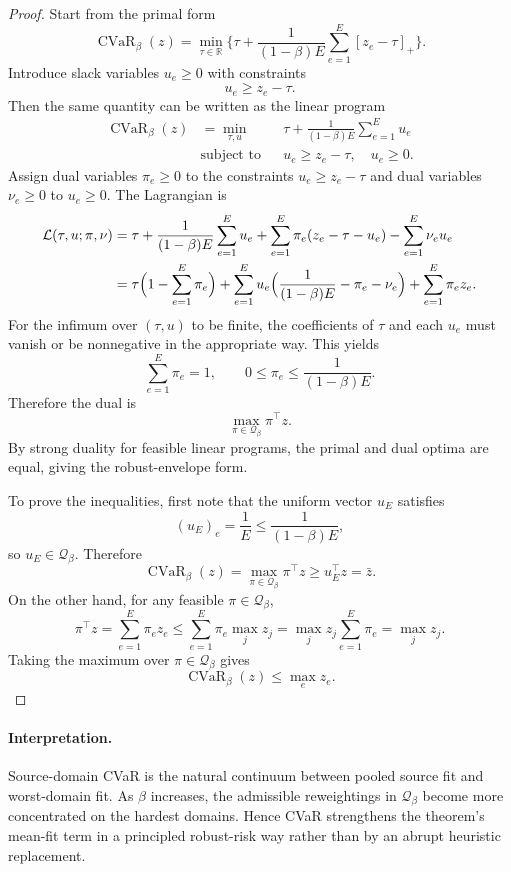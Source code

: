\documentclass[11pt]{article}
\newcommand{\R}{\mathbb{R}}
\newcommand{\1}{\mathbf{1}}
\newcommand{\cvar}{\operatorname{CVaR}}
\newcommand{\ubar}{u_E}
\newcommand{\Qset}{\mathcal{Q}_\beta}
\theoremstyle{plain}
\theoremstyle{definition}
\theoremstyle{remark}
\begin{document}
\begin{proof}
Start from the primal form
\[
\cvar_{\beta}(z)
= \min_{\tau \in \R} \Biggl\{\tau + \frac{1}{(1-\beta)E}\sum_{e=1}^E [z_e - \tau]_+\Biggr\}.
\]
Introduce slack variables $u_e \ge 0$ with constraints
\[
u_e \ge z_e - \tau.
\]
Then the same quantity can be written as the linear program
\begin{align*}
\cvar_{\beta}(z)
&= \min_{\tau, u} && \tau + \frac{1}{(1-\beta)E}\sum_{e=1}^E u_e \\
&\text{subject to} && u_e \ge z_e - \tau, \quad u_e \ge 0.
\end{align*}
Assign dual variables $\pi_e \ge 0$ to the constraints $u_e \ge z_e - \tau$ and dual variables $\nu_e \ge 0$ to $u_e \ge 0$. The Lagrangian is
\begin{align*}
\mathcal{L}(\tau, u; \pi, \nu)
&= \tau + \frac{1}{(1-\beta)E}\sum_{e=1}^E u_e
+ \sum_{e=1}^E \pi_e(z_e - \tau - u_e)
- \sum_{e=1}^E \nu_e u_e \\
&= \tau\Bigl(1 - \sum_{e=1}^E \pi_e\Bigr)
+ \sum_{e=1}^E u_e\Bigl(\frac{1}{(1-\beta)E} - \pi_e - \nu_e\Bigr)
+ \sum_{e=1}^E \pi_e z_e.
\end{align*}
For the infimum over $(\tau,u)$ to be finite, the coefficients of $\tau$ and each $u_e$ must vanish or be nonnegative in the appropriate way. This yields
\[
\sum_{e=1}^E \pi_e = 1,
\qquad
0 \le \pi_e \le \frac{1}{(1-\beta)E}.
\]
Therefore the dual is
\[
\max_{\pi \in \Qset} \pi^\top z.
\]
By strong duality for feasible linear programs, the primal and dual optima are equal, giving the robust-envelope form.

To prove the inequalities, first note that the uniform vector $\ubar$ satisfies
\[
(\ubar)_e = \frac{1}{E} \le \frac{1}{(1-\beta)E},
\]
so $\ubar \in \Qset$. Therefore
\[
\cvar_{\beta}(z) = \max_{\pi \in \Qset} \pi^\top z \ge \ubar^\top z = \bar z.
\]
On the other hand, for any feasible $\pi \in \Qset$,
\[
\pi^\top z = \sum_{e=1}^E \pi_e z_e \le \sum_{e=1}^E \pi_e \max_j z_j = \max_j z_j \sum_{e=1}^E \pi_e = \max_j z_j.
\]
Taking the maximum over $\pi \in \Qset$ gives
\[
\cvar_{\beta}(z) \le \max_e z_e.
\]
\end{proof}

\paragraph{Interpretation.}
Source-domain CVaR is the natural continuum between pooled source fit and worst-domain fit. As $\beta$ increases, the admissible reweightings in $\Qset$ become more concentrated on the hardest domains. Hence CVaR strengthens the theorem's mean-fit term in a principled robust-risk way rather than by an abrupt heuristic replacement.
\end{document}

